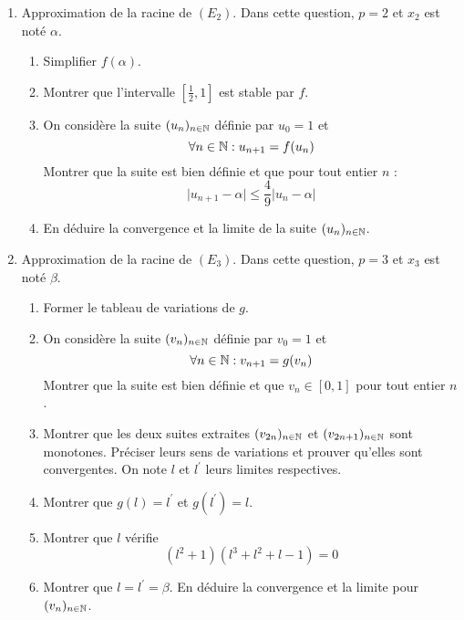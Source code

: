 \begin{enumerate}
\item Approximation de la racine de $(E_2)$. Dans cette question, $p=2$ et $x_2$ est noté $\alpha$.
\begin{enumerate}
 \item Simplifier $f(\alpha)$.
 \item Montrer que l'intervalle $[\frac{1}{2},1]$ est stable par $f$.
 \item On considère la suite $(u_n)_{n\in\mathbb{N}}$ définie par $u_0 = 1$ et
\begin{displaymath}
\forall n\in \mathbb{N} : u_{n+1} = f(u_n)
\end{displaymath}
Montrer que la suite est bien définie et que pour tout entier $n$ :
\begin{displaymath}
 \vert u_{n+1} -\alpha\vert \leq \dfrac{4}{9}\vert u_n -\alpha \vert
\end{displaymath}
\item En déduire la convergence et la limite de la suite $(u_n)_{n\in\mathbb{N}}$.
\end{enumerate}


\item Approximation de la racine de $(E_3)$. Dans cette question, $p=3$ et $x_3$ est noté $\beta$.
\begin{enumerate}
 \item Former le tableau de variations de $g$.
 \item On considère la suite $(v_n)_{n\in\mathbb{N}}$ définie par $v_0 = 1$ et
\begin{displaymath}
 \forall n\in \mathbb{N} : v_{n+1} = g(v_n)
\end{displaymath}
Montrer que la suite est bien définie et que $v_n\in [0,1]$ pour tout entier $n$.
 \item Montrer que les deux suites extraites $(v_{2n})_{n\in\mathbb{N}}$ et $(v_{2n+1})_{n\in\mathbb{N}}$ sont monotones. Préciser leurs sens de variations et prouver qu'elles sont convergentes. On note $l$ et $l^\prime$ leurs limites respectives.
\item Montrer que $g(l)=l^\prime$ et $g(l^\prime)=l$.
\item Montrer que $l$ vérifie
\begin{displaymath}
 (l^2+1)(l^3+l^2+l-1)=0
\end{displaymath}
\item Montrer que $l=l^\prime = \beta$. En déduire la convergence et la limite pour $(v_n)_{n\in\mathbb{N}}$. 
\end{enumerate}

\end{enumerate}
